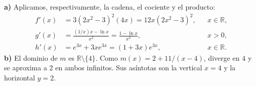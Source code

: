 \textbf{a)} Aplicamos, respectivamente, la cadena, el cociente y el producto:
\[
\begin{aligned}
f'(x)&=3(2x^2-3)^2(4x)=12x(2x^2-3)^2, &&x\in\mathbb R,\\
g'(x)&=\frac{(1/x)x-\ln x}{x^2}=\frac{1-\ln x}{x^2}, &&x>0,\\
h'(x)&=e^{3x}+3xe^{3x}=(1+3x)e^{3x}, &&x\in\mathbb R.
\end{aligned}
\]
\textbf{b)} El dominio de $m$ es $\mathbb R\setminus\{4\}$. Como $m(x)=2+11/(x-4)$, diverge en $4$ y se aproxima a $2$ en ambos infinitos. Sus asíntotas son la vertical $\boxed{x=4}$ y la horizontal $\boxed{y=2}$.
